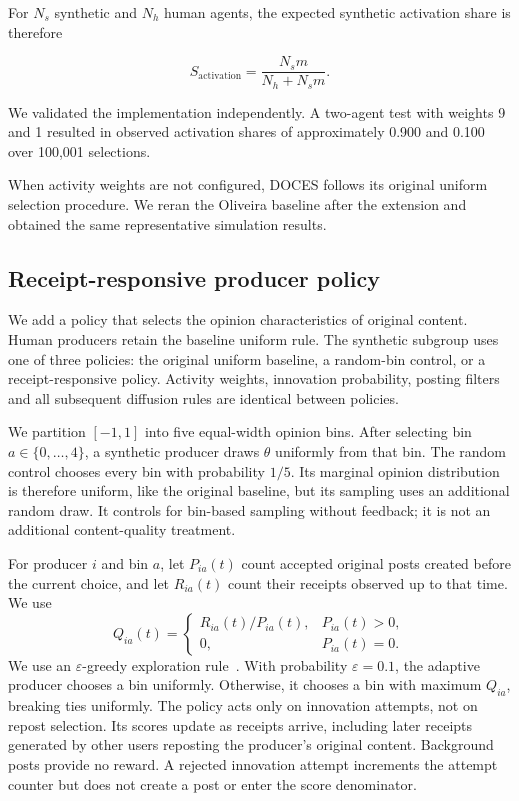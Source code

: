 \documentclass[runningheads]{llncs}
\begin{document}
For \(N_s\) synthetic and \(N_h\) human agents, the expected synthetic activation share is therefore

\[
S_{\mathrm{activation}} = \frac{N_s m}{N_h + N_s m}.
\]

We validated the implementation independently. A two-agent test with weights 9 and 1 resulted in observed activation shares of approximately 0.900 and 0.100 over 100,001 selections.

When activity weights are not configured, DOCES follows its original uniform selection procedure. We reran the Oliveira baseline after the extension and obtained the same representative simulation results.

\subsection{Receipt-responsive producer policy}
\label{sec:producer-policy}

We add a policy that selects the opinion characteristics of original content. Human producers retain the baseline uniform rule. The synthetic subgroup uses one of three policies: the original uniform baseline, a random-bin control, or a receipt-responsive policy. Activity weights, innovation probability, posting filters and all subsequent diffusion rules are identical between policies.

We partition \([-1,1]\) into five equal-width opinion bins. After selecting bin \(a\in\{0,\ldots,4\}\), a synthetic producer draws \(\theta\) uniformly from that bin. The random control chooses every bin with probability \(1/5\). Its marginal opinion distribution is therefore uniform, like the original baseline, but its sampling uses an additional random draw. It controls for bin-based sampling without feedback; it is not an additional content-quality treatment.

For producer \(i\) and bin \(a\), let \(P_{ia}(t)\) count accepted original posts created before the current choice, and let \(R_{ia}(t)\) count their receipts observed up to that time. We use
\[
Q_{ia}(t)=\begin{cases}
R_{ia}(t)/P_{ia}(t), & P_{ia}(t)>0,\\
0, & P_{ia}(t)=0.
\end{cases}
\]
We use an \(\varepsilon\)-greedy exploration rule~\cite{sutton2018}. With probability \(\varepsilon=0.1\), the adaptive producer chooses a bin uniformly. Otherwise, it chooses a bin with maximum \(Q_{ia}\), breaking ties uniformly. The policy acts only on innovation attempts, not on repost selection. Its scores update as receipts arrive, including later receipts generated by other users reposting the producer's original content. Background posts provide no reward. A rejected innovation attempt increments the attempt counter but does not create a post or enter the score denominator.
\end{document}
